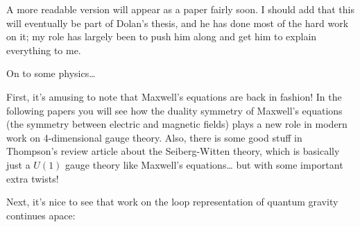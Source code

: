 \documentclass{article}
\def\tightlist{}
\renewcommand{\texttt}[1]{%
  \begingroup
  \ttfamily
  \begingroup\lccode`~=`/\lowercase{\endgroup\def~}{/\discretionary{}{}{}}%
  \begingroup\lccode`~=`[\lowercase{\endgroup\def~}{[\discretionary{}{}{}}%
  \begingroup\lccode`~=`.\lowercase{\endgroup\def~}{.\discretionary{}{}{}}%
  \catcode`/=\active\catcode`[=\active\catcode`.=\active
  \scantokens{#1\noexpand}%
  \endgroup
}
\begin{document}

A more readable version will appear as a paper fairly soon. I should add
that this will eventually be part of Dolan's thesis, and he has done
most of the hard work on it; my role has largely been to push him along
and get him to explain everything to me.

On to some physics\ldots{}

First, it's amusing to note that Maxwell's equations are back in
fashion! In the following papers you will see how the duality symmetry
of Maxwell's equations (the symmetry between electric and magnetic
fields) plays a new role in modern work on 4-dimensional gauge theory.
Also, there is some good stuff in Thompson's review article about the
Seiberg-Witten theory, which is basically just a \(U(1)\) gauge theory
like Maxwell's equations\ldots{} but with some important extra twists!


Next, it's nice to see that work on the loop representation of quantum
gravity continues apace:
\end{document}
